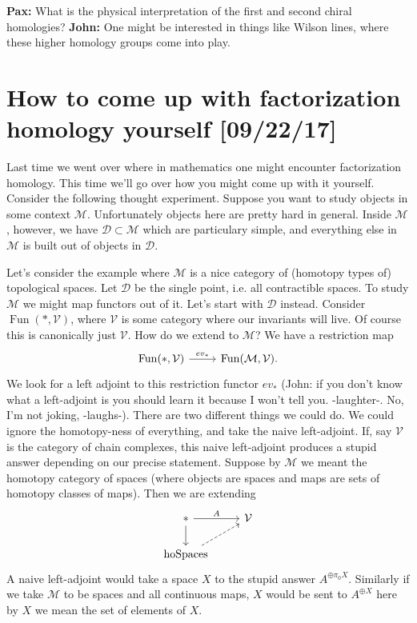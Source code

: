 \documentclass{amsart}
\DeclareMathOperator{\Fun}{Fun}
\begin{document}
\textbf{Pax:} What is the physical interpretation of the first and second chiral
homologies? \textbf{John:} One might be interested in things like Wilson lines,
where these higher homology groups come into play.

\section{How to come up with factorization homology yourself [09/22/17]}

Last time we went over where in mathematics one might encounter factorization homology.
This time we'll go over how you might come up with it yourself. Consider the following
thought experiment. Suppose you want to study objects in some context $\mathcal{M}$.
Unfortunately objects here are pretty hard in general. Inside $\mathcal{M}$, however,
we have $\mathcal{D}\subset \mathcal{M}$ which are particulary simple, and everything else
in $\mathcal{M}$ is built out of objects in $\mathcal{D}$.

Let's consider the example where $\mathcal{M}$ is a nice category of (homotopy types of)
topological spaces. Let $\mathcal{D}$ be the single point, i.e. all contractible spaces.
To study $\mathcal{M}$ we might map functors out of it. Let's start with $\mathcal{D}$
instead. Consider $\Fun(*, \mathcal{V})$, where $\mathcal{V}$ is some category where
our invariants will live. Of course this is canonically just $\mathcal{V}$. How do we 
extend to $\mathcal{M}$? We have a restriction map
\begin{equation*}
    \begin{tikzcd}
        \Fun(*,\mathcal{V}) \rar{ev_*} & \Fun(\mathcal{M},\mathcal{V}).
    \end{tikzcd}
\end{equation*}
We look for a left adjoint to this restriction functor $ev_*$ (John: if you don't know what
a left-adjoint is you should learn it because I won't tell you. -laughter-. No, I'm not joking, -laughs-).
There are two different
things we could do. We could ignore the homotopy-ness of everything, and take the naive
left-adjoint. If, say $\mathcal{V}$ is the category of chain complexes, this naive
left-adjoint produces a stupid answer depending on our precise statement. Suppose by $\mathcal{M}$
we meant the homotopy category of spaces (where objects are spaces and maps are sets of
homotopy classes of maps). Then we are extending
\begin{equation*}
    \begin{tikzcd}
        *\rar{A}\dar & \mathcal{V}\\
        \text{hoSpaces}\urar[dashed]
    \end{tikzcd}
\end{equation*}
A naive left-adjoint would take a space $X$ to the stupid answer $A^{\oplus \pi_0X}$.
Similarly if we take $\mathcal{M}$ to be spaces and all continuous maps, $X$ would
be sent to $A^{\oplus X}$ here by $X$ we mean the set of elements of $X$.
\end{document}
